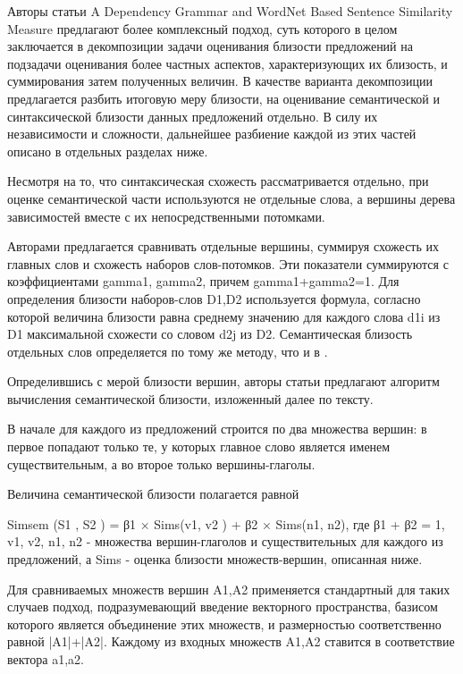 Авторы статьи A Dependency Grammar and WordNet Based Sentence Similarity Measure\cite{complexSim}
предлагают более комплексный подход, суть которого в целом заключается в декомпозиции задачи
оценивания близости предложений на подзадачи оценивания более частных аспектов, 
характеризующих их близость, и суммирования затем полученных величин.
В качестве варианта декомпозиции предлагается разбить итоговую меру близости, 
на оценивание семантической и синтаксической близости данных предложений отдельно.
В силу их независимости и сложности, дальнейшее разбиение
каждой из этих частей описано в отдельных разделах ниже.

Несмотря на то, что синтаксическая схожесть рассматривается отдельно, 
при оценке семантической части используются не отдельные слова, а
вершины дерева зависимостей вместе с их непосредственными потомками.

Авторами предлагается сравнивать отдельные вершины, суммируя схожесть их главных слов
и схожесть наборов слов-потомков. Эти показатели суммируются с коэффициентами gamma1, gamma2, причем gamma1+gamma2=1.
Для определения близости наборов-слов D1,D2 используется формула, согласно которой
величина близости равна среднему значению для каждого слова d1i из D1 максимальной схожести
со словом d2j из D2. 
Семантическая близость отдельных слов определяется по тому же методу, что и в \cite{wordnetSim}.

Определившись с мерой близости вершин, авторы статьи предлагают 
алгоритм вычисления семантической близости, изложенный далее по тексту.

В начале для каждого из предложений строится по два множества вершин:
в первое попадают только те, у которых главное слово является именем существительным,
а во второе только вершины-глаголы.

Величина семантической близости полагается равной

Simsem (S1 , S2 ) = β1 × Sims(v1, v2 ) + β2 × Sims(n1, n2), где 
β1 + β2 = 1, 
v1, v2, n1, n2 - множества вершин-глаголов и существительных для каждого из предложений,
а Sims - оценка близости множеств-вершин, описанная ниже.

Для сравниваемых множеств вершин A1,A2 применяется стандартный для таких случаев подход,
подразумевающий введение векторного пространства, базисом которого является объединение этих множеств,
и размерностью соответственно равной |A1|+|A2|.  
Каждому из входных множеств A1,A2 ставится в соответствие вектора a1,a2.

